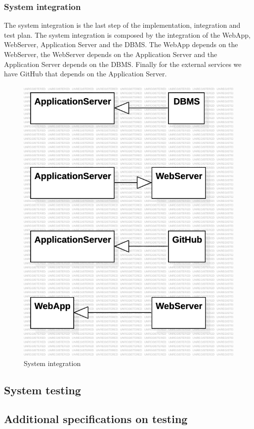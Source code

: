 \subsubsection*{System integration}
The system integration is the last step of the implementation, integration and test plan. The system integration is composed by the integration of the WebApp, WebServer, Application Server and the DBMS. The WebApp depends on the WebServer, the WebServer depends on the Application Server and the Application Server depends on the DBMS. Finally for the external services we have GitHub that depends on the Application Server.
\begin{figure}[H]
    \centering
    \includegraphics[width=\textwidth]{Diagrams/SystemIntegrationPlan.jpg}
    \caption{System integration}
    \label{fig:system_integration}
\end{figure}
\subsection{System testing}
\subsection{Additional specifications on testing}